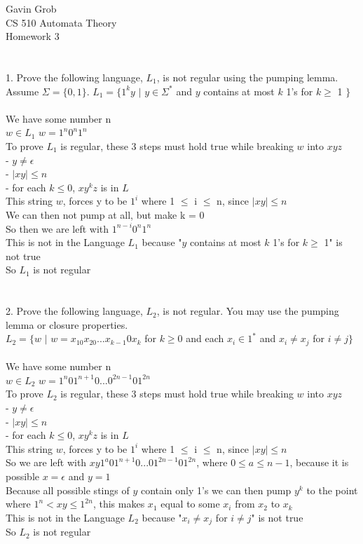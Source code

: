 \documentclass[11pt, oneside]{article}   	%
\begin{document}
Gavin Grob
\\CS 510 Automata Theory
\\Homework 3
\\
\\
\\1. Prove the following language, $L_1$, is not regular using the pumping lemma. Assume $\Sigma = \{0, 1\}$. $L_1 = \{1^k y$ $|$ $y \in \Sigma^*$ and $y$ contains at most $k$ 1's for $k \geq$ 1 $\}$
\\
\\We have some number n
\\$w \in L_1$ $w =  1^n0^n1^n$
\\To prove $L_1$ is regular, these 3 steps must hold true while breaking $w$ into $xyz$
\\ -    $y \neq \epsilon$
\\ -    $|xy| \leq n$
\\ -     for each $k \leq 0$, $xy^kz$ is in $L$
\\This string $w$, forces y to be $1^i$ where 1 $\leq$ i $\leq$ n, since $|xy| \leq n$
\\We can then not pump at all, but make k = 0
\\So then we are left with $1^{n-i}0^n1^n$
\\This is not in the Language $L_1$ because "$y$ contains at most $k$ 1's for $k \geq$ 1" is not true
\\So $L_1$ is not regular
\\
\\
\\
2. Prove the following language, $L_2$, is not regular. You may use the pumping lemma or closure properties.
\\$L_2 = \{ w$ $|$ $w = x_10x_20...x_{k-1}0x_k$ for $k \geq 0$ and each $x_i \in 1^*$ and $x_i \neq x_j$ for $i \neq j\}$
\\
\\We have some number n
\\$w \in L_2$ $w = 1^n01^{n+1}0...0^{2n - 1}01^{2n}$
\\To prove $L_2$ is regular, these 3 steps must hold true while breaking $w$ into $xyz$
\\ -    $y \neq \epsilon$
\\ -    $|xy| \leq n$
\\ -     for each $k \leq 0$, $xy^kz$ is in $L$
\\This string $w$, forces y to be $1^i$ where 1 $\leq$ i $\leq$ n, since $|xy| \leq n$
\\So we are left with $xy1^a01^{n+1}0...01^{2n - 1}01^{2n}$, where $0 \leq a \leq n-1$, because it is possible $x = \epsilon$ and $y = 1$
\\Because all possible stings of $y$ contain only 1's we can then pump $y^k$ to the point where  $1^{n} < xy \leq 1^{2n}$, this makes $x_1$ equal to some $x_i$ from $x_2$ to $x_k$
\\This is not in the Language $L_2$ because "$x_i \neq x_j$ for $i \neq j$" is not true
\\So $L_2$ is not regular
\\


\end{document}
